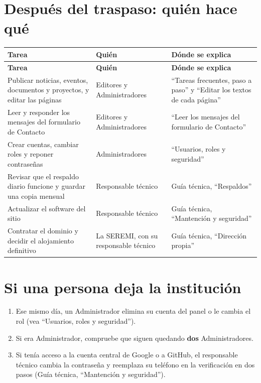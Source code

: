 \documentclass[11pt,letterpaper]{report}
\begin{document}
\section{Después del traspaso: quién hace qué}
\begin{longtable}{>{\raggedright\arraybackslash}p{}>{\raggedright\arraybackslash}p{}>{\raggedright\arraybackslash}p{}}
\rowcolor{h2vazul}\textbf{\color{white}Tarea} & \textbf{\color{white}Quién} & \textbf{\color{white}Dónde se explica} \\
\endfirsthead
\rowcolor{h2vazul}\textbf{\color{white}Tarea} & \textbf{\color{white}Quién} & \textbf{\color{white}Dónde se explica} \\
\endhead
Publicar noticias, eventos, documentos y proyectos, y editar las páginas & Editores y Administradores & “Tareas frecuentes, paso a paso” y “Editar los textos de cada página” \\ \midrule
\rowcolor{filaalt}Leer y responder los mensajes del formulario de Contacto & Editores y Administradores & “Leer los mensajes del formulario de Contacto” \\ \midrule
Crear cuentas, cambiar roles y reponer contraseñas & Administradores & “Usuarios, roles y seguridad” \\ \midrule
\rowcolor{filaalt}Revisar que el respaldo diario funcione y guardar una copia mensual & Responsable técnico & Guía técnica, “Respaldos” \\ \midrule
Actualizar el software del sitio & Responsable técnico & Guía técnica, “Mantención y seguridad” \\ \midrule
\rowcolor{filaalt}Contratar el dominio y decidir el alojamiento definitivo & La SEREMI, con su responsable técnico & Guía técnica, “Dirección propia” \\ \bottomrule
\end{longtable}
\section{Si una persona deja la institución}
\begin{enumerate}
  \item Ese mismo día, un Administrador elimina su cuenta del panel o le cambia el rol (vea “Usuarios, roles y seguridad”).
  \item Si era Administrador, compruebe que siguen quedando \textbf{dos} Administradores.
  \item Si tenía acceso a la cuenta central de Google o a GitHub, el responsable técnico cambia la contraseña y reemplaza su teléfono en la verificación en dos pasos (Guía técnica, “Mantención y seguridad”).
\end{enumerate}
\end{document}
